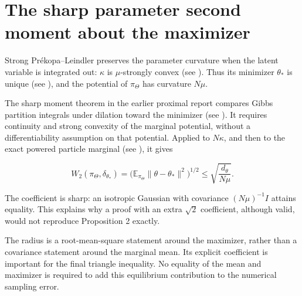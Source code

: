 \documentclass[11pt,a4paper]{report}
\begin{document}
\section{\texorpdfstring{The sharp parameter second moment about the maximizer}{The sharp parameter second moment about the maximizer}}


Strong Prékopa–Leindler preserves the parameter curvature when the latent
variable is integrated out: \(\kappa\) is \(\mu\)-strongly convex (see \cite[Section~3.12.3]{LangevinLean2026IPLA}). Thus its minimizer \(\theta_*\) is unique (see \cite[Section~3.12.4]{LangevinLean2026IPLA}), and the potential of \(\pi_\Theta\) has curvature \(N\mu\).




The sharp moment theorem in the earlier proximal report compares Gibbs partition integrals under dilation toward the minimizer (see \cite[Section~3.5.2]{LangevinLean2026Proximal}). It requires continuity and strong convexity of the marginal potential, without a differentiability assumption on that potential. Applied to \(N\kappa\), and then to the exact powered particle marginal (see \cite[Section~3.6.1]{LangevinLean2026Proximal}), it gives


\[W_2(\pi_\Theta,\delta_{\theta_*})
=\bigl(\mathbb E_{\pi_\Theta}\|\theta-\theta_*\|^2\bigr)^{1/2}
\le\sqrt{\frac{d_\theta}{N\mu}}.\]


The coefficient is sharp: an isotropic Gaussian with covariance
\((N\mu)^{-1}I\) attains equality. This explains why a proof with an extra
\(\sqrt2\) coefficient, although valid, would not reproduce Proposition 2
exactly.



The radius is a root-mean-square statement around the maximizer, rather than a covariance statement around the marginal mean. Its explicit coefficient is important for the final triangle inequality. No equality of the mean and maximizer is required to add this equilibrium contribution to the numerical sampling error.
\end{document}
